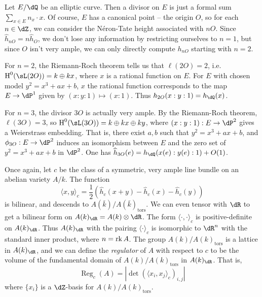 \documentclass{article}
\begin{document}
\begin{example}
Let $E/\dQ$ be an elliptic curve. Then a divisor on $E$ is just a formal sum 
$\sum_{x\in E} n_x\cdot x$. Of course, $E$ has a canonical point -- the origin 
$O$, so for each $n\in \dZ$, we can consider the N\'eron-Tate height associated 
with $n O$. Since $\widehat h_{n O}=n \widehat h_O$, we don't lose any 
information by restricting ourselves to $n=1$, but since $O$ isn't very ample, 
we can only directly compute $h_{n O}$ starting with $n=2$. 

For $n=2$, the Riemann-Roch theorem tells us that $\ell(2 O)=2$, i.e. 
$\h^0(\sL(2 O)) = k\oplus k x$, where $x$ is a rational function on $E$. For 
$E$ with chosen model $y^2=x^3+a x+b$, $x$ the rational function corresponds to 
the map $E\to \dP^1$ given by $(x:y:1)\mapsto (x:1)$. Thus 
$h_{2 O}(x:y:1)=h_\dQ(x)$. 

For $n=3$, the divisor $3 O$ is actually very ample. By the Riemann-Roch 
theorem, $\ell(3 O)=3$, so $\h^0(\sL(3 O))=k\oplus k x\oplus k y$, where 
$(x:y:1):E\to \dP^2$ gives a Weierstrass embedding. That is, there exist 
$a,b$ such that $y^2=x^3+a x+b$, and $\phi_{3 O}:E\to \dP^2$ induces an 
isomorphism between $E$ and the zero set of $y^2=x^3+a x+b$ in $\dP^2$. 
One has $\widehat h_{3 O}(e)=h_\dQ(x(e):y(e):1)+O(1)$. 
\end{example}

Once again, let $c$ be the class of a symmetric, very ample line bundle on an 
abelian variety $A/k$. The function  
\[
  \langle x,y\rangle_c = \frac 1 2 \left(\widehat h_c(x+y) - \widehat h_c(x)-\widehat h_c(y)\right)
\]
is bilinear, and descends to $A(\bar k)/A(\bar k)_\text{tors}$. 
We can even tensor with $\dR$ to get a bilinear form on 
$A(k)_\dR = A(k)\otimes \dR$. The form $\langle \cdot,\cdot\rangle_c$ 
is positive-definite on $A(k)_\dR$. Thus $A(k)_\dR$ with the pairing 
$\langle\cdot\rangle_c$ is isomorphic to $\dR^n$ with the standard inner 
product, where $n=\operatorname{rk} A$. The group $A(k)/A(k)_\text{tors}$ is a 
lattice in $A(k)_\dR$, and we can define the \emph{regulator} of $A$ with 
respect to $c$ to be the volume of the fundamental domain of 
$A(k)/A(k)_\text{tors}$ in $A(k)_\dR$. That is, 
\[
  \operatorname{Reg}_c(A) = \left|\det\left(\langle x_i,x_j\rangle_c\right)_{i,j}\right|
\]
where $\{x_i\}$ is a $\dZ$-basis for $A(k)/A(k)_\text{tors}$. 
\end{document}
